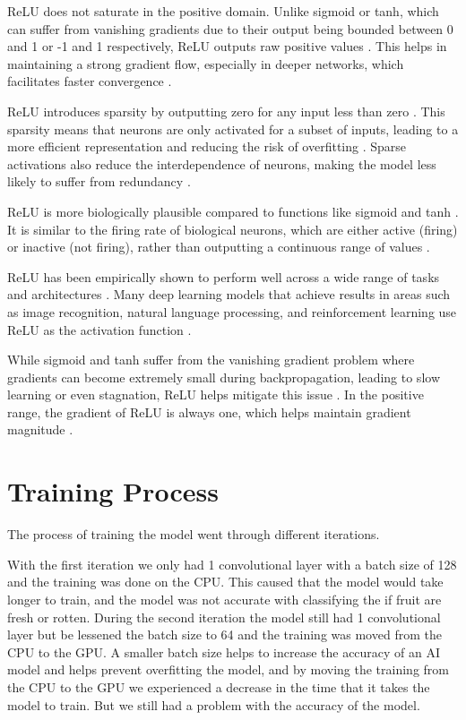 \documentclass[conference]{IEEEtran}
\begin{document}
ReLU does not saturate in the positive domain. Unlike sigmoid or tanh, which can suffer from vanishing gradients due to their output being bounded between 0 and 1 or -1 and 1 respectively, ReLU outputs raw positive values \cite{b30}. This helps in maintaining a strong gradient flow, especially in deeper networks, which facilitates faster convergence \cite{b31}.

ReLU introduces sparsity by outputting zero for any input less than zero \cite{b31}. This sparsity means that neurons are only activated for a subset of inputs, leading to a more efficient representation and reducing the risk of overfitting \cite{b31}. Sparse activations also reduce the interdependence of neurons, making the model less likely to suffer from redundancy \cite{b31}.

ReLU is more biologically plausible compared to functions like sigmoid and tanh \cite{b30}. It is similar to the firing rate of biological neurons, which are either active (firing) or inactive (not firing), rather than outputting a continuous range of values \cite{b31}.

ReLU has been empirically shown to perform well across a wide range of tasks and architectures \cite{b32}. Many deep learning models that achieve results in areas such as image recognition, natural language processing, and reinforcement learning use ReLU as the activation function \cite{b32}.

While sigmoid and tanh suffer from the vanishing gradient problem where gradients can become extremely small during backpropagation, leading to slow learning or even stagnation, ReLU helps mitigate this issue \cite{b30}. In the positive range, the gradient of ReLU is always one, which helps maintain gradient magnitude \cite{b30}.

\section{Training Process}

The process of training the model went through different iterations.

With the first iteration we only had 1 convolutional layer with a batch size of 128 and the training was done on the CPU. This caused that the model would take longer to train, and the model was not accurate with classifying the if fruit are fresh or rotten. During the second iteration the model still had 1 convolutional layer but be lessened the batch size to 64 and the training was moved from the CPU to the GPU. A smaller batch size helps to increase the accuracy of an AI model \cite{b2} and helps prevent overfitting the model, and by moving the training from the CPU to the GPU we experienced a decrease in the time that it takes the model to train. But we still had a problem with the accuracy of the model.
\end{document}
